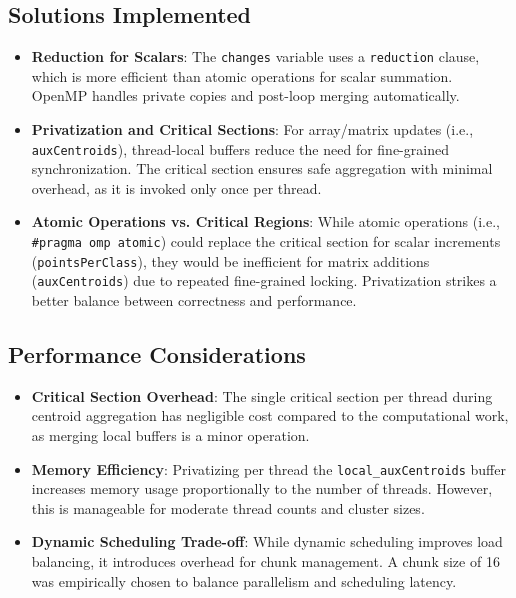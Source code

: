 \documentclass[11pt, journal]{IEEEtran}
\begin{document}
\subsection{Solutions Implemented}

\begin{itemize}
    \item \textbf{Reduction for Scalars}: The \texttt{changes} variable uses a \texttt{reduction} clause, which is more efficient than atomic operations for scalar summation. OpenMP handles private copies and post-loop merging automatically.
    \item \textbf{Privatization and Critical Sections}: For array/matrix updates (i.e., \texttt{auxCentroids}), thread-local buffers reduce the need for fine-grained synchronization. The critical section ensures safe aggregation with minimal overhead, as it is invoked only once per thread.
    \item \textbf{Atomic Operations vs. Critical Regions}: While atomic operations (i.e., \texttt{\#pragma omp atomic}) could replace the critical section for scalar increments (\texttt{pointsPerClass}), they would be inefficient for matrix additions (\texttt{auxCentroids}) due to repeated fine-grained locking. Privatization strikes a better balance between correctness and performance.
\end{itemize}

\subsection{Performance Considerations}

\begin{itemize}
    \item \textbf{Critical Section Overhead}: The single critical section per thread during centroid aggregation has negligible cost compared to the computational work, as merging local buffers is a minor operation.
    \item \textbf{Memory Efficiency}: Privatizing per thread the \texttt{local\_auxCentroids} buffer increases memory usage proportionally to the number of threads. However, this is manageable for moderate thread counts and cluster sizes.
    \item \textbf{Dynamic Scheduling Trade-off}: While dynamic scheduling improves load balancing, it introduces overhead for chunk management. A chunk size of 16 was empirically chosen to balance parallelism and scheduling latency.
\end{itemize}
\end{document}
